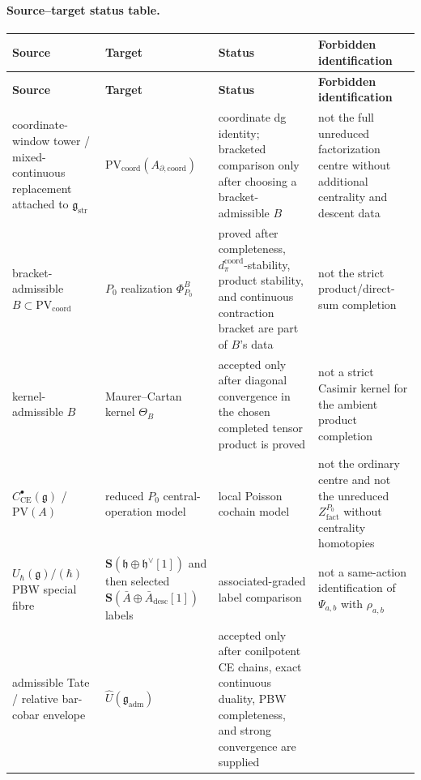 \paragraph{Source--target status table.}
\begin{longtable}{@{}>{\raggedright\arraybackslash}p{}
  >{\raggedright\arraybackslash}p{}
  >{\raggedright\arraybackslash}p{}
  >{\raggedright\arraybackslash}p{}@{}}
\hline
\textbf{Source} & \textbf{Target} & \textbf{Status} &
\textbf{Forbidden identification}\\
\hline
\endfirsthead
\hline
\textbf{Source} & \textbf{Target} & \textbf{Status} &
\textbf{Forbidden identification}\\
\hline
\endhead
coordinate-window tower / mixed-continuous replacement attached to
\(\mathfrak g_{\mathrm{str}}\) &
\(\mathrm{PV}_{\mathrm{coord}}(A_{\partial,\mathrm{coord}})\) &
coordinate dg identity; bracketed comparison only after choosing a
bracket-admissible \(B\) &
not the full unreduced factorization centre without additional centrality
and descent data\\
\hline
bracket-admissible \(B\subset\mathrm{PV}_{\mathrm{coord}}\) &
\(P_0\) realization \(\Phi^B_{P_0}\) &
proved after completeness, \(d_\pi^{\mathrm{coord}}\)-stability, product stability, and
continuous contraction bracket are part of \(B\)'s data &
not the strict product/direct-sum completion\\
\hline
kernel-admissible \(B\) &
Maurer--Cartan kernel \(\Theta_B\) &
accepted only after diagonal convergence in the chosen completed tensor
product is proved &
not a strict Casimir kernel for the ambient product completion\\
\hline
\(C^\bullet_{\mathrm{CE}}(\mathfrak g)\) / \(\mathrm{PV}(A)\) &
reduced \(P_0\) central-operation model &
local Poisson cochain model &
not the ordinary centre and not the unreduced
\(Z^{P_0}_{\mathrm{fact}}\) without centrality homotopies\\
\hline
\(U_\hbar(\mathfrak g)/(\hbar)\) PBW special fibre &
\(\mathbf S(\mathfrak h\oplus\mathfrak h^\vee[1])\) and then selected
\(\mathbf S(\bar A\oplus\bar A_{\mathrm{desc}}[1])\) labels &
associated-graded label comparison &
not a same-action identification of \(\Psi_{a,b}\) with
\(\rho_{a,b}\)\\
\hline
admissible Tate / relative bar-cobar envelope &
\(\widehat U(\mathfrak g_{\mathrm{adm}})\) &
accepted only after conilpotent CE chains, exact continuous duality, PBW
completeness, and strong convergence are supplied &

\end{longtable}
